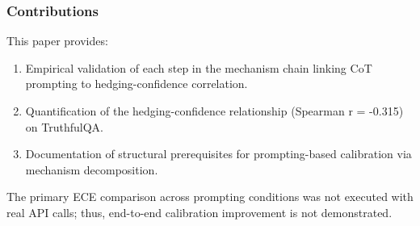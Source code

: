 \subsubsection{Contributions}

This paper provides:
\begin{enumerate}
\item Empirical validation of each step in the mechanism chain linking CoT prompting to hedging-confidence correlation.
\item Quantification of the hedging-confidence relationship (Spearman r = -0.315) on TruthfulQA.
\item Documentation of structural prerequisites for prompting-based calibration via mechanism decomposition.
\end{enumerate}

The primary ECE comparison across prompting conditions was not executed with real API calls; thus, end-to-end calibration improvement is not demonstrated.
